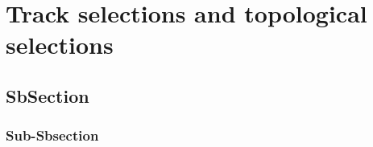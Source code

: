 \newpage
\section{Track selections and topological selections}
\label{sec:Section04}

\subsection{SbSection}
\label{sec:Section0x.a-}

\subsubsection{Sub-Sbsection}